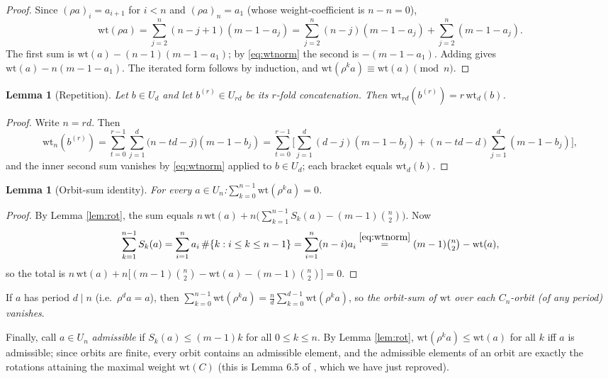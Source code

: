 \documentclass[11pt]{amsart}
\newtheorem{lemma}[theorem]{Lemma}
\theoremstyle{definition}
\newcommand{\wt}{\mathrm{wt}}
\begin{document}
\begin{proof}
Since $(\rho a)_i=a_{i+1}$ for $i<n$ and $(\rho a)_n=a_1$ (whose weight-coefficient is $n-n=0$),
\[
\wt(\rho a)=\sum_{j=2}^{n}(n-j+1)(m-1-a_j)
=\sum_{j=2}^n (n-j)(m-1-a_j)+\sum_{j=2}^n(m-1-a_j).
\]
The first sum is $\wt(a)-(n-1)(m-1-a_1)$; by \eqref{eq:wtnorm} the second is $-(m-1-a_1)$. Adding gives $\wt(a)-n(m-1-a_1)$. The iterated form follows by induction, and $\wt(\rho^k a)\equiv\wt(a)\pmod n$.
\end{proof}

\begin{lemma}[Repetition]\label{lem:rep}
Let $b\in U_d$ and let $b^{(r)}\in U_{rd}$ be its $r$-fold concatenation. Then $\wt_{rd}(b^{(r)})=r\,\wt_d(b)$.
\end{lemma}

\begin{proof}
Write $n=rd$. Then
\[
\wt_n(b^{(r)})=\sum_{t=0}^{r-1}\sum_{j=1}^{d}\big(n-td-j\big)(m-1-b_j)
=\sum_{t=0}^{r-1}\Big[\sum_{j=1}^d (d-j)(m-1-b_j)+(n-td-d)\sum_{j=1}^d(m-1-b_j)\Big],
\]
and the inner second sum vanishes by \eqref{eq:wtnorm} applied to $b\in U_d$; each bracket equals $\wt_d(b)$.
\end{proof}

\begin{lemma}[Orbit-sum identity]\label{lem:orbit}
For every $a\in U_n$:\quad $\displaystyle\sum_{k=0}^{n-1}\wt(\rho^k a)=0$.
\end{lemma}

\begin{proof}
By Lemma \ref{lem:rot}, the sum equals $n\,\wt(a)+n\big(\sum_{k=1}^{n-1}S_k(a)-(m-1)\binom n2\big)$. Now
\[
\sum_{k=1}^{n-1}S_k(a)=\sum_{i=1}^n a_i\,\#\{k: i\le k\le n-1\}=\sum_{i=1}^n(n-i)a_i
\overset{\eqref{eq:wtnorm}}{=}(m-1)\tbinom n2-\wt(a),
\]
so the total is $n\,\wt(a)+n\big[(m-1)\binom n2 -\wt(a)-(m-1)\binom n2\big]=0$.
\end{proof}

If $a$ has period $d\mid n$ (i.e.\ $\rho^d a=a$), then $\sum_{k=0}^{n-1}\wt(\rho^ka)=\frac nd\sum_{k=0}^{d-1}\wt(\rho^ka)$, so \emph{the orbit-sum of $\wt$ over each $C_n$-orbit (of any period) vanishes}.

Finally, call $a\in U_n$ \emph{admissible} if $S_k(a)\le(m-1)k$ for all $0\le k\le n$. By Lemma \ref{lem:rot}, $\wt(\rho^ka)\le \wt(a)$ for all $k$ iff $a$ is admissible; since orbits are finite, every orbit contains an admissible element, and the admissible elements of an orbit are exactly the rotations attaining the maximal weight $\wt(C)$ (this is Lemma 6.5 of \cite{Rei1102}, which we have just reproved).
\end{document}
